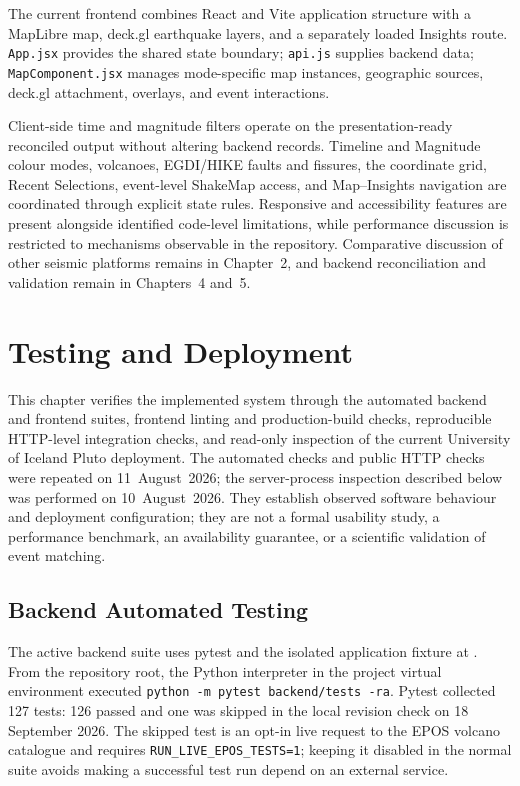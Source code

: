 \documentclass[12pt]{article}
\begin{document}
The current frontend combines React and Vite application structure with a MapLibre map, deck.gl earthquake layers, and a separately loaded Insights route. \texttt{App.jsx} provides the shared state boundary; \texttt{api.js} supplies backend data; \texttt{MapComponent.jsx} manages mode-specific map instances, geographic sources, deck.gl attachment, overlays, and event interactions.

Client-side time and magnitude filters operate on the presentation-ready reconciled output without altering backend records. Timeline and Magnitude colour modes, volcanoes, EGDI/HIKE faults and fissures, the coordinate grid, Recent Selections, event-level ShakeMap access, and Map--Insights navigation are coordinated through explicit state rules. Responsive and accessibility features are present alongside identified code-level limitations, while performance discussion is restricted to mechanisms observable in the repository. Comparative discussion of other seismic platforms remains in Chapter~2, and backend reconciliation and validation remain in Chapters~4 and~5.

\newpage

\section{Testing and Deployment}
\label{sec:testing-deployment}


This chapter verifies the implemented system through the automated backend and frontend suites, frontend linting and production-build checks, reproducible HTTP-level integration checks, and read-only inspection of the current University of Iceland Pluto deployment. The automated checks and public HTTP checks were repeated on 11~August~2026; the server-process inspection described below was performed on 10~August~2026. They establish observed software behaviour and deployment configuration; they are not a formal usability study, a performance benchmark, an availability guarantee, or a scientific validation of event matching.

\subsection{Backend Automated Testing}

The active backend suite uses pytest and the isolated application fixture at . From the repository root, the Python interpreter in the project virtual environment executed \texttt{python -m pytest backend/tests -ra}. Pytest collected 127 tests: 126 passed and one was skipped in the local revision check on 18 September 2026. The skipped test is an opt-in live request to the EPOS volcano catalogue and requires \texttt{RUN\_LIVE\_EPOS\_TESTS=1}; keeping it disabled in the normal suite avoids making a successful test run depend on an external service.
\end{document}
